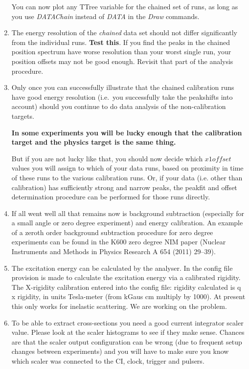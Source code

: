 \documentclass[11pt]{report}
\begin{document}
\begin{enumerate}
You can now plot any TTree variable for the chained set of runs, as long as you use
{\it DATAChain} instead of {\it DATA} in the {\it Draw} commands.

\item
The energy resolution of the {\it chained} data set
should not differ significantly from the individual runs.
{\bf Test this}. If you find the peaks in the chained position spectrum have worse resolution
than your worst single run, your position offsets may not be good enough. Revisit that
part of the analysis procedure.

\item Only once you can successfully illustrate that the chained calibration runs
have good energy resolution (i.e.~you successfully take the peakshifts into account)
should you continue to do data analysis of the non-calibration targets.

{\bf In some experiments you will be lucky enough that the calibration target and the
physics target is the same thing.} 

But if you are not lucky like that, 
you should now decide which $x1offset$ values you will assign to which
of your data runs, based on proximity in time of these runs to the various
calibration runs.
Or, if your data (i.e. other than calibration) has sufficiently strong and narrow peaks, the
peakfit and offset determination procedure can be performed for those runs directly.




\item If all went well all that remains now is background subtraction (especially for a small angle or
zero degree experiment) and energy calibration.
An example of a zeroth order background subtraction procedure for zero degree experiments can be found in the
K600 zero degree NIM paper (Nuclear Instruments and Methods in Physics Research A 654 (2011) 29–39).


\item  The excitation energy can be calculated by the analyser. 
In the config file provision is made to calculate the excitation energy via a calibrated rigidity.
The X-rigidity calibration entered into the config file: rigidity calculated is q x rigidity,
in units Tesla-meter (from kGaus cm multiply by 1000).
At present this only works for inelastic scattering. We are working on the problem.


\item To be able to extract cross-sections you need a good current integrator scaler value.
Please look at the scaler histograms to see if they make sense. Chances are that the scaler
output configuration can be wrong (due to frequent setup changes between experiments) and you
will have to make sure you know which scaler was connected to the CI, clock, trigger and pulsers.

\end{enumerate}
\end{document}
